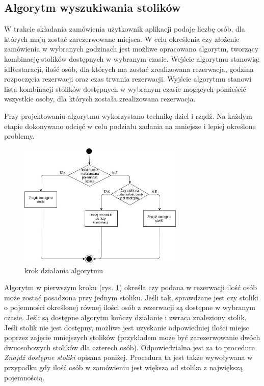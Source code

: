 \documentclass{article}
\begin{document}
\newpage
\subsection{Algorytm wyszukiwania stolików}
W trakcie składania zamówienia użytkownik aplikacji podaje liczbę osób, dla których mają zostać zarezerwowane miejsca. W celu określenia czy złożenie zamówienia w wybranych godzinach jest możliwe opracowano algorytm, tworzący kombinację stolików dostępnych w wybranym czasie. Wejście algorytmu stanowią:
idRestaracji,
ilość osób, dla których ma zostać zrealizowana rezerwacja,
godzina rozpoczęcia rezerwacji oraz
czas trwania rezerwacji.
Wyjście algorytmu stanowi lista kombinacji stolików dostępnych w wybranym czasie mogących pomieścić wszystkie osoby, dla których została zrealizowana rezerwacja. 

Przy projektowaniu algorytmu wykorzystano technikę dziel i rządź. Na każdym etapie dokonywano odcięć w celu podziału zadania na mniejsze i lepiej określone problemy.

\begin{figure}[h]
\centering
	\includegraphics[width=0.70\textwidth]{algo1.jpg}
	\caption{krok działania algorytmu}
	\label{fig:alg1}
\end{figure}

Algorytm w pierwszym kroku (rys. \ref{fig:alg1}) określa czy podana w rezerwacji ilość osób może zostać posadzona przy jednym stoliku. Jeśli tak, sprawdzane jest czy stoliki o pojemności określonej równej ilości osób z rezerwacji są dostępne w wybranym czasie. Jeśli są dostępne algorytm kończy działanie i zwraca znaleziony stolik. Jeśli stolik nie jest dostępny, możliwe jest uzyskanie odpowiedniej ilości miejsc poprzez zajęcie mniejszych stolików (przykładem może być zarezerwowanie dwóch dwuosobowych stolików dla czterech osób). Odpowiedzialna jest za to procedura \textit{Znajdź dostępne stoliki} opisana poniżej. Procedura ta jest także wywoływana w przypadku gdy ilość osób w zamówieniu jest większa od stolika z największą pojemnością.
\end{document}
